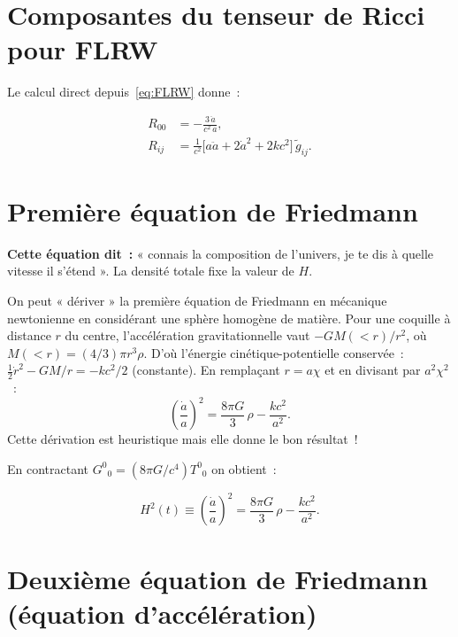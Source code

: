 \documentclass[11pt,a4paper,openany]{report}
\begin{document}
\section{Composantes du tenseur de Ricci pour FLRW}

Le calcul direct depuis~\eqref{eq:FLRW} donne~:

\begin{align}
R_{00} &= -\frac{3\,\ddot a}{c^{2}\,a},\\
R_{ij} &= \frac{1}{c^{2}}\bigl[a\ddot a + 2\dot a^{2} + 2kc^{2}\bigr]\,\tilde g_{ij}.
\end{align}

\section{Première équation de Friedmann}

\begin{tcolorbox}[vulgarisation]
\textbf{Cette équation dit~:} « connais la composition de l'univers, je te dis
à quelle vitesse il s'étend ». La densité totale fixe la valeur de $H$.
\end{tcolorbox}

\begin{tcolorbox}[mathspe]
On peut « dériver » la première équation de Friedmann en mécanique newtonienne
en considérant une sphère homogène de matière. Pour une coquille à distance $r$
du centre, l'accélération gravitationnelle vaut $-GM(<r)/r^{2}$, où
$M(<r) = (4/3)\pi r^{3}\rho$. D'où l'énergie cinétique-potentielle conservée~:
$\tfrac{1}{2}\dot r^{2} - GM/r = -kc^{2}/2$ (constante). En remplaçant $r=a\chi$
et en divisant par $a^{2}\chi^{2}$~:
\[
\left(\frac{\dot a}{a}\right)^{2} = \frac{8\pi G}{3}\,\rho - \frac{kc^{2}}{a^{2}}.
\]
Cette dérivation est heuristique mais elle donne le bon résultat~!
\end{tcolorbox}

En contractant $G^{0}{}_{0} = (8\pi G/c^{4}) T^{0}{}_{0}$ on obtient~:

\begin{equation}
\boxed{\;H^{2}(t) \equiv \left(\frac{\dot a}{a}\right)^{2}
       = \frac{8\pi G}{3}\,\rho - \frac{k c^{2}}{a^{2}}.\;}
\label{eq:F1}
\end{equation}

\section{Deuxième équation de Friedmann (équation d'accélération)}
\end{document}
